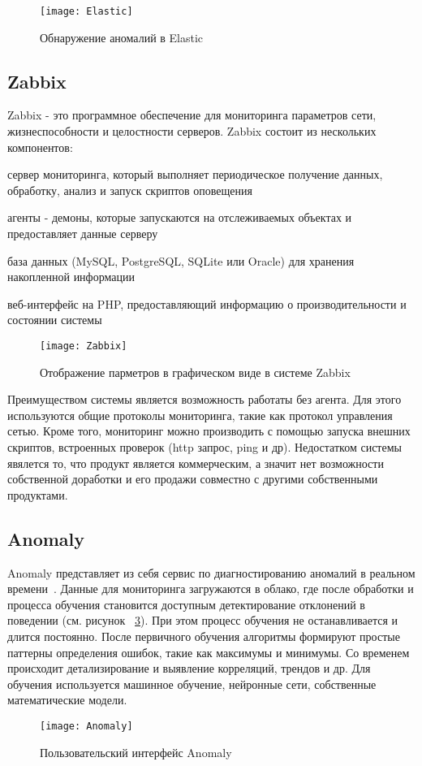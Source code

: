 \begin{figure}[htbp]
	\centering
	\texttt{[image: Elastic]}
	\caption{Обнаружение аномалий в Elastic}
	\label{fig:Elastic}
\end{figure}

\subsection{Zabbix}

Zabbix - это программное обеспечение для мониторинга параметров сети, жизнеспособности и целостности серверов. Zabbix состоит из нескольких компонентов:
\begin{itemize*}
	\item{сервер мониторинга, который выполняет периодическое получение данных, обработку, анализ и запуск скриптов оповещения}
	\item{агенты - демоны, которые запускаются на отслеживаемых объектах и предоставляет данные серверу}
	\item{база данных (MySQL, PostgreSQL, SQLite или Oracle) для хранения накопленной информации}
	\item{веб-интерфейс на PHP, предоставляющий информацию о производительности и состоянии системы}
\end{itemize*}

\begin{figure}[!htbp]
	\centering
	\texttt{[image: Zabbix]}
	\caption{Отображение парметров в графическом виде в системе Zabbix}
	\label{fig:Zabbix}
\end{figure}

Преимуществом системы является возможность работаты без агента. Для этого используются общие протоколы мониторинга, такие как протокол управления сетью.  Кроме того, мониторинг можно производить с помощью запуска внешних скриптов, встроенных проверок (http запрос, ping и др). Недостатком системы явялется то, что продукт является коммерческим, а значит нет возможности собственной доработки и его продажи совместно с другими собственными продуктами.  

\subsection{Anomaly} 
Anomaly представляет из себя сервис по диагностированию аномалий в реальном времени~\cite{Anomaly}. Данные для мониторинга загружаются в облако, где после обработки и процесса обучения становится доступным детектирование отклонений в поведении (см. рисунок ~\ref{fig:Anomaly}). При этом процесс обучения не останавливается и длится постоянно. После первичного обучения алгоритмы формируют простые паттерны определения ошибок, такие как максимумы и минимумы. Со временем происходит детализирование и выявление корреляций, трендов и др. Для обучения используется машинное обучение, нейронные сети, собственные математические модели. 
\begin{figure}[!h]
	\centering
	\texttt{[image: Anomaly]}
	\caption{Пользовательский интерфейс Anomaly}
	\label{fig:Anomaly}
\end{figure}

